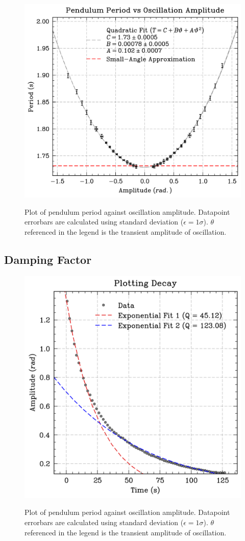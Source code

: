 \documentclass[prl,twocolumn,amsmath,amssymb,superscriptaddress]{revtex4-2}
\begin{document}
\begin{figure}[htb]
    \includegraphics[width=1\linewidth]{amp-per.png}
    \label{fig:amplitude-period}
    \caption{Plot of pendulum period against oscillation amplitude. Datapoint errorbars are calculated using standard deviation ($\epsilon = 1\sigma$). $\theta$ referenced in the legend is the transient amplitude of oscillation.}
\end{figure}



\subsection{Damping Factor}


\begin{figure}[htb]
    \includegraphics[width=0.8\linewidth]{decay.png}
    \label{fig:decay}
    \caption{Plot of pendulum period against oscillation amplitude. Datapoint errorbars are calculated using standard deviation ($\epsilon = 1\sigma$). $\theta$ referenced in the legend is the transient amplitude of oscillation.}
\end{figure}
\end{document}
